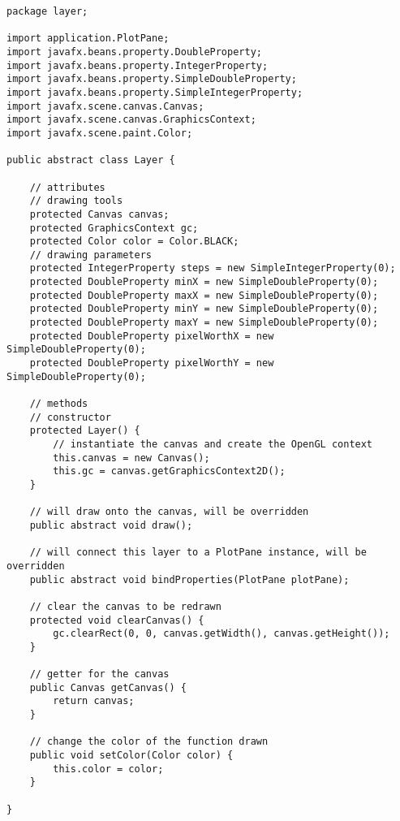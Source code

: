 \documentclass[../../../../main.tex]{subfiles}
\begin{document}
\begin{verbatim}
package layer;

import application.PlotPane;
import javafx.beans.property.DoubleProperty;
import javafx.beans.property.IntegerProperty;
import javafx.beans.property.SimpleDoubleProperty;
import javafx.beans.property.SimpleIntegerProperty;
import javafx.scene.canvas.Canvas;
import javafx.scene.canvas.GraphicsContext;
import javafx.scene.paint.Color;

public abstract class Layer {

	// attributes
	// drawing tools
	protected Canvas canvas;
	protected GraphicsContext gc;
	protected Color color = Color.BLACK;
	// drawing parameters
	protected IntegerProperty steps = new SimpleIntegerProperty(0);
	protected DoubleProperty minX = new SimpleDoubleProperty(0);
	protected DoubleProperty maxX = new SimpleDoubleProperty(0);
	protected DoubleProperty minY = new SimpleDoubleProperty(0);
	protected DoubleProperty maxY = new SimpleDoubleProperty(0);
	protected DoubleProperty pixelWorthX = new SimpleDoubleProperty(0);
	protected DoubleProperty pixelWorthY = new SimpleDoubleProperty(0);

	// methods
	// constructor
	protected Layer() {
		// instantiate the canvas and create the OpenGL context
		this.canvas = new Canvas();
		this.gc = canvas.getGraphicsContext2D();
	}

	// will draw onto the canvas, will be overridden
	public abstract void draw();

	// will connect this layer to a PlotPane instance, will be overridden
	public abstract void bindProperties(PlotPane plotPane);

	// clear the canvas to be redrawn
	protected void clearCanvas() {
		gc.clearRect(0, 0, canvas.getWidth(), canvas.getHeight());
	}

	// getter for the canvas
	public Canvas getCanvas() {
		return canvas;
	}

	// change the color of the function drawn
	public void setColor(Color color) {
		this.color = color;
	}

}
\end{verbatim}
\newpage
\end{document}
